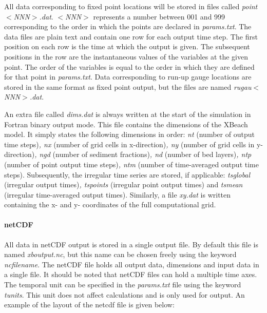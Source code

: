\documentclass{article}
\begin{document}
\noindent All data corresponding to fixed point locations will be stored in files called \textit{point$<$NNN$>$.dat}. \textit{$<$NNN$>$} represents a number between 001 and 999 corresponding to the order in which the points are declared in \textit{params.txt}. The data files are plain text and contain one row for each output time step. The first position on each row is the time at which the output is given. The subsequent positions in the row are the instantaneous values of the variables at the given point. The order of the variables is equal to the order in which they are defined for that point in \textit{params.txt}. Data corresponding to run-up gauge locations are stored in the same format as fixed point output, but the files are named \textit{rugau$<$NNN$>$.dat}.

\noindent An extra file called \textit{dims.dat} is always written at the start of the simulation in Fortran binary output mode. This file contains the dimensions of the XBeach model. It simply states the following dimensions in order: \textit{nt }(number of output time steps)\textit{, nx }(number of grid cells in x-direction)\textit{, ny }(number of grid cells in y-direction)\textit{, ngd} (number of sediment fractions)\textit{, nd }(number of bed layers)\textit{, ntp }(number of point output time steps)\textit{, ntm }(number of time-averaged output time steps). Subsequently, the irregular time series are stored, if applicable:\textit{ tsglobal }(irregular output times)\textit{, tspoints }(irregular point output times)\textit{ }and\textit{ tsmean }(irregular time-averaged output times). Similarly, a file \textit{xy.dat} is written containing the x- and y- coordinates of the full computational grid.


\paragraph{ netCDF}

\noindent All data in netCDF output is stored in a single output file. By default this file is named \textit{xboutput.nc}, but this name can be chosen freely using the keyword \textit{ncfilename}. The netCDF file holds all output data, dimensions and input data in a single file. It should be noted that netCDF files can hold a multiple time axes. The temporal unit can be specified in the \textit{params.txt} file using the keyword \textit{tunits}. This unit does not affect calculations and is only used for output. An example of the layout of the netcdf file is given below:
\end{document}
